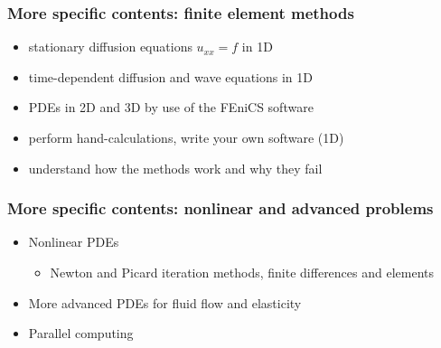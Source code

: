\documentclass{beamer}
\begin{document}
\begin{frame}
\frametitle{More specific contents: finite element methods}

\begin{block}{}
\begin{itemize}
   \item stationary diffusion equations $u_{xx}=f$ in 1D

   \item time-dependent diffusion and wave equations in 1D

   \item PDEs in 2D and 3D by use of the FEniCS software

   \item perform hand-calculations, write your own software (1D)

   \item understand how the methods work and why they fail
\end{itemize}

\noindent
\end{block}
\end{frame}

\begin{frame}
\frametitle{More specific contents: nonlinear and advanced problems}

\begin{block}{}
\begin{itemize}
 \item Nonlinear PDEs
\begin{itemize}

   \item Newton and Picard iteration methods, finite differences and elements

\end{itemize}

\noindent
 \item More advanced PDEs for fluid flow and elasticity

 \item Parallel computing
\end{itemize}

\noindent
\end{block}
\end{frame}
\end{document}
